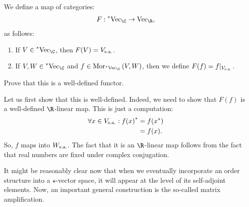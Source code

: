 \documentclass[main.tex]{subfiles}
\begin{document}
\begin{exercise}\label{ex: functor from a star vector space to selfadjoint elements}We define a map of categories: 
\[F: \StarVect \to \Vect{\R},\]    
as follows: 
\begin{enumerate}
    \item If $V \in \StarVect$, then $F(V) = V_{\text{s.a.}}$. 
    \item If $V,W \in \StarVect$ and $f \in \Mor{\StarVect}{V}{W}$, then we define $F(f) = f|_{V_{\text{s.a.}}}$. 
\end{enumerate}
Prove that this is a well-defined functor. 
\end{exercise}
\begin{solution}\label{sol: functor from a star vector space to selfadjoint elements}Let us first show that this is well-defined. Indeed, we need to show that $F(f)$ is a well-defined $\R$-linear map. This is just a computation: 
\begin{align*}
\forall x \in V_{\text{s.a.}}: {f(x)}^{*} &= f({x}^{*})\\ 
                                               &= f(x).
\end{align*}
So, $f$ maps into $W_{\text{s.a.}}$. The fact that it is an $\R$-linear map follows from the fact that real numbers are fixed under complex conjugation.
\end{solution}

It might be reasonably clear now that when we eventually incorporate an order structure into a $\star$-vector space, it will appear at the level of its self-adjoint elements.  Now, an important general construction is the so-called matrix amplification. 
\end{document}
